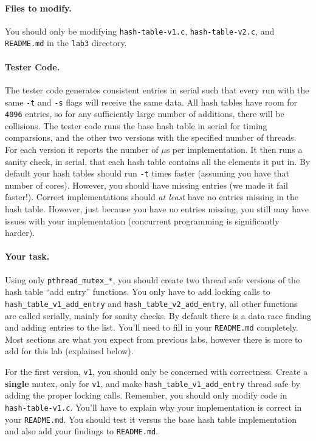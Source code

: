 \paragraph{Files to modify.}

You should only be modifying \texttt{hash-table-v1.c}, \texttt{hash-table-v2.c},
and \texttt{README.md} in the \texttt{lab3} directory.

\paragraph{Tester Code.}

The tester code generates consistent entries in serial such that every run
with the same \texttt{-t} and \texttt{-s} flags will receive the same data.
All hash tables have room for \texttt{4096} entries, so for any sufficiently
large number of additions, there will be collisions.
The tester code runs the base hash table in serial for timing comparsions,
and the other two versions with the specified number of threads.
For each version it reports the number of $\mu$s per implementation.
It then runs a sanity check, in serial, that each hash table contains all
the elements it put in.
By default your hash tables should run \texttt{-t} times faster (assuming you
have that number of cores).
However, you should have missing entries (we made it fail faster!).
Correct implementations should \textit{at least} have no entries missing in
the hash table.
However, just because you have no entries missing, you still may have issues
with your implementation (concurrent programming is significantly harder).

\paragraph{Your task.}

Using only \texttt{pthread\_mutex\_*}, you should create two thread safe
versions of the hash table ``add entry'' functions.
You only have to add locking calls to \texttt{hash\_table\_v1\_add\_entry}
and \texttt{hash\_table\_v2\_add\_entry}, all other functions are called
serially, mainly for sanity checks.
By default there is a data race finding and adding entries to the list.
You'll need to fill in your \texttt{README.md} completely.
Most sections are what you expect from previous labs, however there is more
to add for this lab (explained below).

For the first version, \texttt{v1}, you should only be concerned with
correctness.
Create a \textbf{single} mutex, only for \texttt{v1}, and make 
\texttt{hash\_table\_v1\_add\_entry} thread safe by adding the proper locking
calls.
Remember, you should only modify code in \texttt{hash-table-v1.c}.
You'll have to explain why your implementation is correct in your
\texttt{README.md}.
You should test it versus the base hash table implementation and also add your
findings to \texttt{README.md}.

